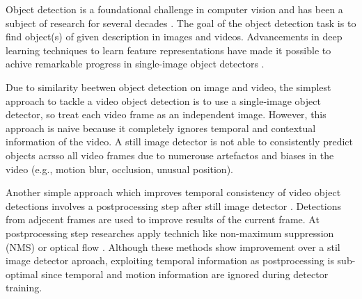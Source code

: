 
Object detection is a foundational challenge in computer vision and has been a subject of research for several decades \cite{fischlerRepresentationMatchingPictorial1973}. The goal of the object detection task is to find object(s) of given description in images and videos. Advancements in deep learning techniques to learn feature representations \cite{hintonReducingDimensionalityData2006, lecunDeepLearning2015} have made it possible to achive remarkable progress in single-image object detectors \cite{girshickRichFeatureHierarchies2014a}.


Due to similarity beetwen object detection on image and video, the simplest approach to tackle a video object detection is to use a single-image object detector, so treat each video frame as an independent image. However, this approach is naive because it completely ignores temporal and contextual information of the video. A still image detector is not able to consistently predict objects acrsso all video frames due to numerouse artefactos and biases in the video (e.g., motion blur, occlusion, unusual position).




Another simple approach which improves temporal consistency of video object detections involves a postprocessing step after still image detector \cite{hanSeqNMSVideoObject2016, kangTCNNTubeletsConvolutional2018, kangObjectDetectionVideo2016}. Detections from adjecent frames are used to improve results of the current frame. At postprocessing step researches apply technich like non-maximum suppression (NMS) \cite{hanSeqNMSVideoObject2016} or optical flow \cite{kangTCNNTubeletsConvolutional2018, kangObjectDetectionVideo2016}. Although these methods show improvement over a stil image detector aproach, exploiting temporal information as postprocessing is sub-optimal since temporal and motion information are ignored during detector training.


